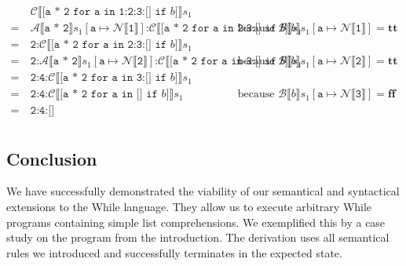 \documentclass[12pt]{article}
\newcommand\mono\texttt
\newcommand{\dblbr}[1]{\llbracket#1\rrbracket}
\newcommand{\fancybr}[2]{#1 \dblbr{#2}}
\renewcommand{\AA}{\mathcal{A}}
\newcommand{\BB}{\mathcal{B}}
\newcommand{\CC}{\mathcal{C}}
\newcommand{\NN}{\mathcal{N}}
\begin{document}
$\begin{aligned}
    & \fancybr{\CC}{\mono{[a * 2 for a in 1:2:3:[] if } b \mono{]}} s_1\\
    =\ & \fancybr{\AA}{\mono{a * 2}} s_1[\mono{a} \mapsto \fancybr{\NN}{\mono{1}}] \mono{:} \fancybr{\CC}{\mono{[a * 2 for a in 2:3:[] if } b \mono{]}} s_1
    & \text{because } \fancybr{\BB}{b} s_1[\mono{a} \mapsto \fancybr{\NN}{\mono{1}}] = \mathbf{tt}\\
    =\ & \mono{2:} \fancybr{\CC}{\mono{[a * 2 for a in 2:3:[] if } b \mono{]}} s_1\\
    =\ & \mono{2:} \fancybr{\AA}{\mono{a * 2}} s_1[\mono{a} \mapsto \fancybr{\NN}{\mono{2}}] \mono{:} \fancybr{\CC}{\mono{[a * 2 for a in 3:[] if } b \mono{]}} s_1
    & \text{because } \fancybr{\BB}{b} s_1[\mono{a} \mapsto \fancybr{\NN}{\mono{2}}] = \mathbf{tt}\\
    =\ & \mono{2:4:} \fancybr{\CC}{\mono{[a * 2 for a in 3:[] if } b \mono{]}} s_1\\
    =\ & \mono{2:4:} \fancybr{\CC}{\mono{[a * 2 for a in [] if } b \mono{]}} s_1
    & \text{because } \fancybr{\BB}{b} s_1[\mono{a} \mapsto \fancybr{\NN}{\mono{3}}] = \mathbf{ff}\\
    =\ & \mono{2:4:[]}\\
\end{aligned}$

\subsection{Conclusion}

We have successfully demonstrated the viability of our semantical and syntactical extensions to the While language. They allow us to execute arbitrary While programs containing simple list comprehensions. We exemplified this by a case study on the program from the introduction. The derivation uses all semantical rules we introduced and successfully terminates in the expected state.

\printbibliography
\end{document}
